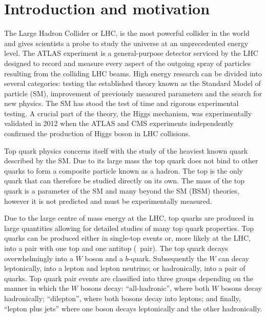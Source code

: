 \chapter{Introduction and motivation}
\label{sec:Introduction}

The Large Hadron Collider or LHC, is the most powerful collider in the world and gives scientists a probe to study the universe at an unprecedented energy level. The ATLAS experiment is a general-purpose detector serviced by the LHC designed to record and measure every aspect of the outgoing spray of particles resulting from the colliding LHC beams. High energy research can be divided into several categories: testing the established theory known as the Standard Model of particle (SM), improvement of previously measured parameters and the search for new physics. The SM has stood the test of time and rigorous experimental testing. A crucial part of the theory, the Higgs mechanism, was experimentally validated in 2012 when the ATLAS and CMS experiments independently confirmed the production of Higgs boson in LHC collisions.

Top quark physics concerns itself with the study of the heaviest known quark described by the SM. Due to its large mass the top quark does not bind to other quarks to form a composite particle known as a hadron. The top is the only quark that can therefore be studied directly on its own. The mass of the top quark is a parameter of the SM and many beyond the SM (BSM) theories, however it is not predicted and must be experimentally measured.

Due to the large centre of mass energy at the LHC, top quarks are produced in large quantities allowing for detailed studies of many top quark properties. Top quarks can be produced either in single-top events or, more likely at the LHC, into a pair with one top and one antitop (\ttbar\ pair). The top quark decays overwhelmingly into a $W$ boson and a $b$-quark. Subsequently the $W$ can decay leptonically, into a lepton and lepton neutrino; or hadronically, into a pair of quarks. Top quark pair events are classified into three groups depending on the manner in which the $W$ bosons decay: ``all-hadronic'', where both $W$ bosons decay hadronically; ``dilepton'', where both bosons decay into leptons; and finally, ``lepton plus jets'' where one boson decays leptonically and the other hadronically.

